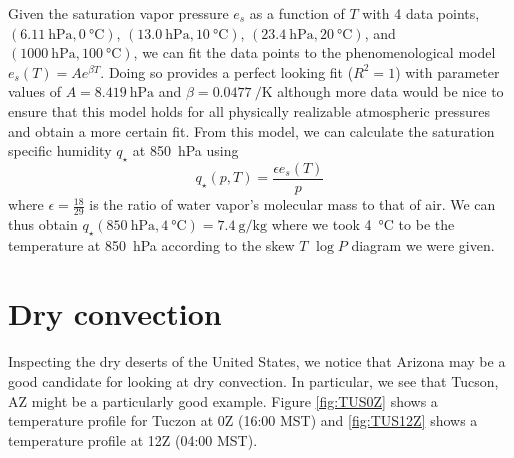 \documentclass[11pt]{article}
\begin{document}
Given the saturation vapor pressure $e_s$ as a function of $T$ with 4 data points, $(\SI{6.11}{\hecto\Pa}, \SI{0}{\degreeCelsius})$, $(\SI{13.0}{\hecto\Pa}, \SI{10}{\degreeCelsius})$, $(\SI{23.4}{\hecto\Pa}, \SI{20}{\degreeCelsius})$, and $(\SI{1000}{\hecto\Pa}, \SI{100}{\degreeCelsius})$, we can fit the data points to the phenomenological model $e_s(T) = Ae^{\beta T}$. Doing so provides a perfect looking fit ($R^2 = 1$) with parameter values of $A = \SI{8.419}{\hecto\Pa}$ and $\beta = \SI{0.0477}{\per\K}$ although more data would be nice to ensure that this model holds for all physically realizable atmospheric pressures and obtain a more certain fit. From this model, we can calculate the saturation specific humidity $q_\star$ at \SI{850}{\hecto\Pa} using
\begin{equation*}
  q_\star(p,T) = \frac{\epsilon e_s(T)}{p}
\end{equation*}
where $\displaystyle \epsilon = \frac{18}{29}$ is the ratio of water vapor's molecular mass to that of air. We can thus obtain $q_\star(\SI{850}{\hecto\Pa}, \SI{4}{\degreeCelsius}) = \SI{7.4}{\g/\kg}$ where we took \SI{4}{\degreeCelsius} to be the temperature at \SI{850}{\hecto\Pa} according to the skew $T$ $\log P$ diagram we were given. 

\section{Dry convection}
Inspecting the dry deserts of the United States, we notice that Arizona may be a good candidate for looking at dry convection. In particular, we see that Tucson, AZ might be a particularly good example. Figure \ref{fig:TUS0Z} shows a temperature profile for Tuczon at 0Z (16:00 MST) and \ref{fig:TUS12Z} shows a temperature profile at 12Z (04:00 MST).
\end{document}
